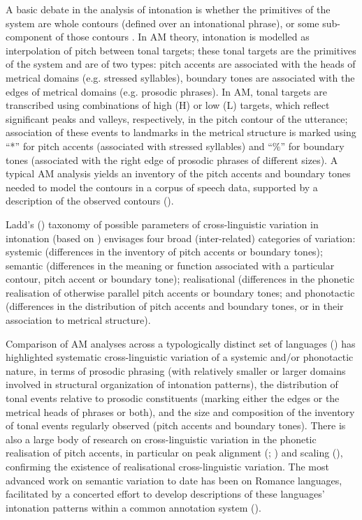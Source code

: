 \documentclass[output=paper]{langsci/langscibook}
\begin{document}
A basic debate in the analysis of intonation is whether the primitives of the system are whole contours (defined over an intonational phrase), or some sub-component of those contours \citep{Ladd2008}. In AM theory, intonation is modelled as interpolation of pitch between tonal targets; these tonal targets are the primitives of the system and are of two types: pitch accents are associated with the heads of metrical domains (e.g. stressed syllables), boundary tones are associated with the edges of metrical domains (e.g. prosodic phrases). In AM, tonal targets are transcribed using combinations of high (H) or low (L) targets, which reflect significant peaks and valleys, respectively, in the pitch contour of the utterance; association of these events to landmarks in the metrical structure is marked using ``*'' for pitch accents (associated with stressed syllables) and ``\%'' for boundary tones (associated with the right edge of prosodic phrases of different sizes). A typical AM analysis yields an inventory of the pitch accents and boundary tones needed to model the contours in a corpus of speech data, supported by a description of the observed contours (\citealt{JunFletcher2015}).

Ladd's (\citeyear{Ladd2008}) taxonomy of possible parameters of cross-linguistic variation in intonation (based on \citealt{Wells1982}) envisages four broad (inter-related) categories of variation: systemic (differences in the inventory of pitch accents or boundary tones); semantic (differences in the meaning or function associated with a particular contour, pitch accent or boundary tone); realisational (differences in the phonetic realisation of otherwise parallel pitch accents or boundary tones; and phonotactic (differences in the distribution of pitch accents and boundary tones, or in their association to metrical structure). 

Comparison of AM analyses across a typologically distinct set of languages (\citealt{Jun2005,Jun2015}) has highlighted systematic cross-linguistic variation of a systemic and/or phonotactic nature, in terms of prosodic phrasing (with relatively smaller or larger domains involved in structural organization of intonation patterns), the distribution of tonal events relative to prosodic constituents (marking either the edges or the metrical heads of phrases or both), and the size and composition of the inventory of tonal events regularly observed (pitch accents and boundary tones). There is also a large body of research on cross-linguistic variation in the phonetic realisation of pitch accents, in particular on peak alignment (\citealt{AttererLadd2004}; \citealt{Ladd2006}) and scaling (\citealt{LaddMorton1997}), confirming the existence of realisational cross-linguistic variation. The most advanced work on semantic variation to date has been on Romance languages, facilitated by a concerted effort to develop descriptions of these languages' intonation patterns within a common annotation system (\citealt{FrotaPrieto2015}). 
\end{document}
